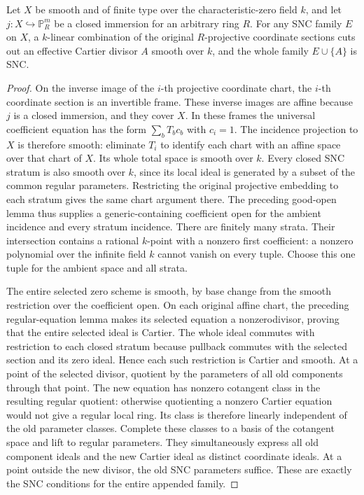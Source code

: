 \begin{lemma}
\label{lem:kn-relative-nadel-bertini-projective-snc}
\leanok
{}
Let $X$ be smooth and of finite type over the characteristic-zero field $k$,
and let $j:X\hookrightarrow\mathbb P^m_R$ be a closed immersion for an
arbitrary ring $R$.  For any SNC family $E$ on $X$, a $k$-linear combination
of the original $R$-projective coordinate sections cuts out an effective
Cartier divisor $A$ smooth over $k$, and the whole family $E\cup\{A\}$
is SNC.
\end{lemma}
\begin{proof}
On the inverse image of the $i$-th projective coordinate chart, the
$i$-th coordinate section is an invertible frame.  These inverse images
are affine because $j$ is a closed immersion, and they cover $X$.
In these frames the universal coefficient equation has the form
$\sum_b T_bc_b$ with $c_i=1$.  The incidence projection to $X$ is
therefore smooth: eliminate $T_i$ to identify each chart with an affine
space over that chart of $X$.  Its whole total space is smooth over $k$.
Every closed SNC stratum is also smooth over $k$, since its local ideal
is generated by a subset of the common regular parameters.  Restricting
the original projective embedding to each stratum gives the same chart
argument there.  The preceding good-open lemma thus supplies a
generic-containing coefficient open for the ambient incidence and every
stratum incidence.  There are finitely many strata.  Their intersection
contains a rational $k$-point with a nonzero first coefficient: a nonzero
polynomial over the infinite field $k$ cannot vanish on every tuple.
Choose this one tuple for the ambient space and all strata.

The entire selected zero scheme is smooth, by base change from the smooth
restriction over the coefficient open.  On each original affine chart,
the preceding regular-equation lemma makes its selected equation a
nonzerodivisor, proving that the entire selected ideal is Cartier.
The whole ideal commutes with restriction to each closed stratum because
pullback commutes with the selected section and its zero ideal.  Hence
each such restriction is Cartier and smooth.  At a point of the selected
divisor, quotient by the parameters of all old components through that
point.  The new equation has nonzero cotangent class in the resulting
regular quotient: otherwise quotienting a nonzero Cartier equation
would not give a regular local ring.  Its class is therefore linearly
independent of the old parameter classes.  Complete these classes to
a basis of the cotangent space and lift to regular parameters.  They
simultaneously express all old component ideals and the new Cartier
ideal as distinct coordinate ideals.  At a point outside the new
divisor, the old SNC parameters suffice.  These are exactly the SNC
conditions for the entire appended family.
\end{proof}

